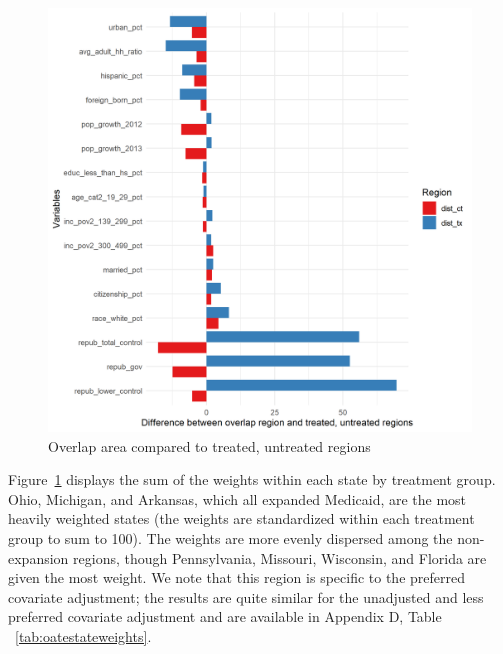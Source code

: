 \documentclass[aoas]{imsart}
\theoremstyle{plain}
\theoremstyle{remark}
\begin{document}
\begin{figure}
\begin{center}
    \caption{Overlap area compared to treated, untreated regions}
    \label{fig:oateimbalance}
    \includegraphics[scale=0.6]{01_Plots/oate-imbalances.png}
\end{center}
\end{figure}

Figure~\ref{fig:oateimbalance} displays the sum of the weights within each state by treatment group. Ohio, Michigan, and Arkansas, which all expanded Medicaid, are the most heavily weighted states (the weights are standardized within each treatment group to sum to 100). The weights are more evenly dispersed among the non-expansion regions, though Pennsylvania, Missouri, Wisconsin, and Florida are given the most weight. We note that this region is specific to the preferred covariate adjustment; the results are quite similar for the unadjusted and less preferred covariate adjustment and are available in Appendix D, Table ~\ref{tab:oatestateweights}.
\end{document}
